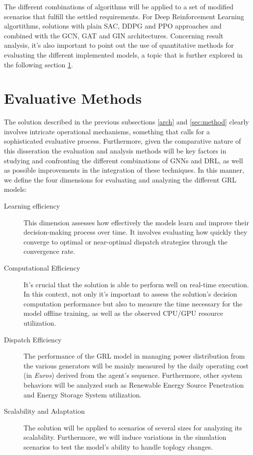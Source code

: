 The different combinations of algorithms will be applied to a set of modified scenarios that fulfill the settled requirements. For Deep Reinforcement Learning algortithms, solutions with plain \ac{SAC}, \ac{DDPG} and \ac{PPO} approaches and combined with the \ac{GCN}, \ac{GAT} and \ac{GIN} architectures. Concerning result analysis, it's also important to point out the use of quantitative methods for evaluating the different implemented models, a topic that is further explored in the following section \ref{sec:eval-methods}.


\section{Evaluative Methods} \label{sec:eval-methods}

The solution described in the previous subsections \ref{arch} and \ref{sec:method} clearly involves intricate operational mechanisms, something that calls for a sophisticated evaluative process. Furthermore, given the comparative nature of this disseration the evaluation and analysis methods will be key factors in studying and confronting the different combinations of \acp{GNN} and \ac{DRL}, as well as possible improvements in the integration of these techniques.
In this manner, we define the four dimensions for evaluating and analyzing the different \ac{GRL} models:

\begin{description}
	\item[Learning efficiency] This dimension assesses how effectively the models learn and improve their decision-making process over time. It involves evaluating how quickly they converge to optimal or near-optimal dispatch strategies through the convergence rate. 
	
	\item[Computational Efficiency] It's crucial that the solution is able to perform well on real-time execution. In this context, not only it's important to assess the solution's decision computation performance but also to measure the time necessary for the model offline training, as well as the observed CPU/GPU resource utilization.
	
	\item[Dispatch Efficiency] The performance of the \ac{GRL} model in managing power distribution from the various generators will be mainly measured by the daily operating cost (in \textit{Euros}) derived from the agent's sequence. Furthermore, other system behaviors will be analyzed such as Renewable Energy Source Penetration and Energy Storage System utilization.
	
	\item[Scalability and Adaptation]  The solution will be applied to scenarios of several sizes for analyzing its scalability. Furthermore, we will induce variations in the simulation scenarios to test the model's ability to handle toplogy changes.
\end{description}

